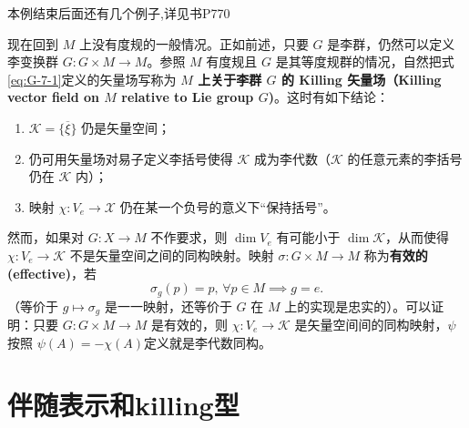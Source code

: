 \documentclass[../main.tex]{subfiles}
\begin{document}
本例结束后面还有几个例子,详见书P770

现在回到 \(M\) 上没有度规的一般情况。正如前述，只要 \(G\) 是李群，仍然可以定义李变换群 \(G : G\times M \to M\)。参照 \(M\) 有度规且 \(G\) 是其等度规群的情况，自然把式\ref{eq:G-7-1}定义的矢量场写称为 
\textbf{\(M\) 上关于李群 \(G\) 的 Killing 矢量场（Killing vector field on \(M\) relative to Lie group \(G\))}。这时有如下结论：
\begin{enumerate}
  \item \(\mathscr{K} = \{ \overline{\xi} \}\) 仍是矢量空间；
  \item 仍可用矢量场对易子定义李括号使得 \(\mathscr{K}\) 成为李代数（\(\mathscr{K}\) 的任意元素的李括号仍在 \(\mathscr{K}\) 内）；
  \item 映射 \(\chi : V_e \to \mathcal{X}\) 仍在某一个负号的意义下“保持括号”。
\end{enumerate}
然而，如果对 \(G : X \to M\) 不作要求，则 \(\dim V_e\) 有可能小于 \(\dim \mathscr{K}\)，从而使得 \(\chi : V_e \to \mathscr{K}\) 不是矢量空间之间的同构映射。映射 \(\sigma : G \times M \to M\)
称为\textbf{有效的(effective)}，若
\[
\sigma_g(p) = p, \, \forall p \in M \implies g = e.
\]
（等价于 \(g \mapsto\sigma_g\) 是一一映射，还等价于 \(G\) 在 \(M\) 上的实现是忠实的）。可以证明：只要 \(G :G\times M \to M\) 是有效的，则 \(\chi : V_e \to \mathscr{K}\) 是矢量空间间的同构映射，\(\psi\) 按照
$\psi (A) = - \chi(A)$定义就是李代数同构。

\chapter{伴随表示和killing型}
\end{document}
